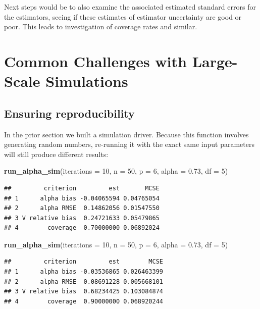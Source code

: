 \documentclass[
]{book}
\newenvironment{Shaded}{\begin{snugshade}}{\end{snugshade}}
\newcommand{\AttributeTok}[1]{\textcolor[rgb]{0.13,0.29,0.53}{#1}}
\newcommand{\DecValTok}[1]{\textcolor[rgb]{0.00,0.00,0.81}{#1}}
\newcommand{\FloatTok}[1]{\textcolor[rgb]{0.00,0.00,0.81}{#1}}
\newcommand{\FunctionTok}[1]{\textcolor[rgb]{0.13,0.29,0.53}{\textbf{#1}}}
\newcommand{\NormalTok}[1]{#1}
\begin{document}
Next steps would be to also examine the associated estimated standard errors
for the estimators, seeing if these estimates of estimator uncertainty are
good or poor. This leads to investigation of coverage rates and similar.

\part{Common Challenges with Large-Scale Simulations}\label{part-common-challenges-with-large-scale-simulations}

\chapter{Ensuring reproducibility}\label{sec-reproducability}

In the prior section we built a simulation driver.
Because this function involves generating random numbers, re-running it with the exact same input parameters will still produce different results:

\begin{Shaded}
\begin{Highlighting}[]
\FunctionTok{run\_alpha\_sim}\NormalTok{(}\AttributeTok{iterations =} \DecValTok{10}\NormalTok{, }\AttributeTok{n =} \DecValTok{50}\NormalTok{, }\AttributeTok{p =} \DecValTok{6}\NormalTok{, }\AttributeTok{alpha =} \FloatTok{0.73}\NormalTok{, }\AttributeTok{df =} \DecValTok{5}\NormalTok{)}
\end{Highlighting}
\end{Shaded}

\begin{verbatim}
##         criterion         est       MCSE
## 1      alpha bias -0.04065594 0.04765054
## 2      alpha RMSE  0.14862056 0.01547550
## 3 V relative bias  0.24721633 0.05479865
## 4        coverage  0.70000000 0.06892024
\end{verbatim}

\begin{Shaded}
\begin{Highlighting}[]
\FunctionTok{run\_alpha\_sim}\NormalTok{(}\AttributeTok{iterations =} \DecValTok{10}\NormalTok{, }\AttributeTok{n =} \DecValTok{50}\NormalTok{, }\AttributeTok{p =} \DecValTok{6}\NormalTok{, }\AttributeTok{alpha =} \FloatTok{0.73}\NormalTok{, }\AttributeTok{df =} \DecValTok{5}\NormalTok{)}
\end{Highlighting}
\end{Shaded}

\begin{verbatim}
##         criterion         est        MCSE
## 1      alpha bias -0.03536865 0.026463399
## 2      alpha RMSE  0.08691228 0.005668101
## 3 V relative bias  0.68234425 0.103084874
## 4        coverage  0.90000000 0.068920244
\end{verbatim}
\end{document}

